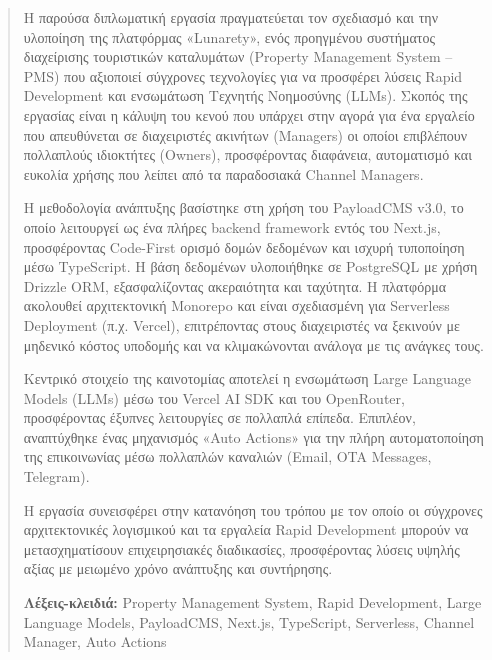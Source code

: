 \documentclass[
	12pt, %
	oneside, %
	greek,
	onehalfspacing, %
	liststotoc, %
	toctotoc, %
	parskip, %
	headsepline, %
]{MastersDoctoralThesis} %
\renewcommand{\abstractname}{Περίληψη}%
\begin{document}
\begin{abstract}
	\addchaptertocentry{\abstractname} %
	
Η παρούσα διπλωματική εργασία πραγματεύεται τον σχεδιασμό και την υλοποίηση της πλατφόρμας «Lunarety», ενός προηγμένου συστήματος διαχείρισης τουριστικών καταλυμάτων (Property Management System -- PMS) που αξιοποιεί σύγχρονες τεχνολογίες για να προσφέρει λύσεις Rapid Development και ενσωμάτωση Τεχνητής Νοημοσύνης (LLMs). Σκοπός της εργασίας είναι η κάλυψη του κενού που υπάρχει στην αγορά για ένα εργαλείο που απευθύνεται σε διαχειριστές ακινήτων (Managers) οι οποίοι επιβλέπουν πολλαπλούς ιδιοκτήτες (Owners), προσφέροντας διαφάνεια, αυτοματισμό και ευκολία χρήσης που λείπει από τα παραδοσιακά Channel Managers.

Η μεθοδολογία ανάπτυξης βασίστηκε στη χρήση του PayloadCMS v3.0, το οποίο λειτουργεί ως ένα πλήρες backend framework εντός του Next.js, προσφέροντας Code-First ορισμό δομών δεδομένων και ισχυρή τυποποίηση μέσω TypeScript. Η βάση δεδομένων υλοποιήθηκε σε PostgreSQL με χρήση Drizzle ORM, εξασφαλίζοντας ακεραιότητα και ταχύτητα. Η πλατφόρμα ακολουθεί αρχιτεκτονική Monorepo και είναι σχεδιασμένη για Serverless Deployment (π.χ. Vercel), επιτρέποντας στους διαχειριστές να ξεκινούν με μηδενικό κόστος υποδομής και να κλιμακώνονται ανάλογα με τις ανάγκες τους.

Κεντρικό στοιχείο της καινοτομίας αποτελεί η ενσωμάτωση Large Language Models (LLMs) μέσω του Vercel AI SDK και του OpenRouter, προσφέροντας έξυπνες λειτουργίες σε πολλαπλά επίπεδα. Επιπλέον, αναπτύχθηκε ένας μηχανισμός «Auto Actions» για την πλήρη αυτοματοποίηση της επικοινωνίας μέσω πολλαπλών καναλιών (Email, OTA Messages, Telegram).

Η εργασία συνεισφέρει στην κατανόηση του τρόπου με τον οποίο οι σύγχρονες αρχιτεκτονικές λογισμικού και τα εργαλεία Rapid Development μπορούν να μετασχηματίσουν επιχειρησιακές διαδικασίες, προσφέροντας λύσεις υψηλής αξίας με μειωμένο χρόνο ανάπτυξης και συντήρησης.

\vspace{1cm}
\noindent\textbf{Λέξεις-κλειδιά:} Property Management System, Rapid Development, Large Language Models, PayloadCMS, Next.js, TypeScript, Serverless, Channel Manager, Auto Actions
	
\end{abstract}

\end{document}
